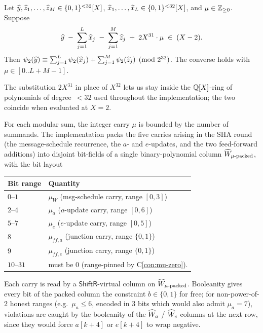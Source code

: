 \begin{lemma}\label{lem:mod-add}
Let $\widehat{y}, \widehat{z}_1,\dots,\widehat{z}_M \in \{0,1\}^{<32}[X]$,
$\widehat{x}_1,\dots,\widehat{x}_L \in \{0,1\}^{<32}[X]$, and $\mu \in \mathbb{Z}_{\ge 0}$.
Suppose
\begin{equation}\label{eq:mod-add}
\widehat{y} \;-\; \sum_{j=1}^{L} \widehat{x}_j \;-\; \sum_{j=1}^{M} \widehat{z}_j \;+\; 2 X^{31} \cdot \mu \;\in\; (X-2).
\end{equation}
Then
$\psi_2(\widehat{y}) \equiv \sum_{j=1}^{L} \psi_2(\widehat{x}_j) + \sum_{j=1}^{M} \psi_2(\widehat{z}_j) \pmod{2^{32}}$.
The converse holds with $\mu \in [0\mathbin{..}L+M-1]$.
\end{lemma}

The substitution $2 X^{31}$ in place of $X^{32}$ lets us stay inside
the $\mathbb{Q}[X]$-ring of polynomials of degree~$<32$ used throughout the
implementation; the two coincide when evaluated at $X = 2$.

\begin{remark}\label{rem:mu-budget}
For each modular sum, the integer carry $\mu$ is bounded by the number
of summands. The implementation packs the five carries arising in the
SHA round (the message-schedule recurrence, the $a$- and $e$-updates,
and the two feed-forward additions) into disjoint bit-fields of a single
binary-polynomial column $\widehat{W}_{\mu\text{-packed}}$, with the bit
layout
\begin{center}
\begin{tabular}{ll}
\toprule
\textbf{Bit range} & \textbf{Quantity} \\
\midrule
$0$--$1$  & $\mu_W$ \quad (msg-schedule carry, range $[0,3]$)\\
$2$--$4$  & $\mu_a$ \quad ($a$-update carry, range $[0,6]$)\\
$5$--$7$  & $\mu_e$ \quad ($e$-update carry, range $[0,5]$)\\
$8$       & $\mu_{ff,a}$ \quad (junction carry, range $\{0,1\}$)\\
$9$       & $\mu_{ff,e}$ \quad (junction carry, range $\{0,1\}$)\\
$10$--$31$ & must be $0$ (range-pinned by C\ref{con:mu-zero}). \\
\bottomrule
\end{tabular}
\end{center}
Each carry is read by a $\mathsf{ShiftR}$-virtual column on
$\widehat{W}_{\mu\text{-packed}}$. Booleanity gives every bit of the packed
column the constraint $b \in \{0,1\}$ for free; for non-power-of-$2$
honest ranges (e.g.\ $\mu_a \le 6$, encoded in $3$ bits which would also
admit $\mu_a = 7$), violations are caught by the booleanity of the
$\widehat{W}_{a}$ / $\widehat{W}_{e}$ columns at the next row, since they would
force $a[k+4]$ or $e[k+4]$ to wrap negative.
\end{remark}
